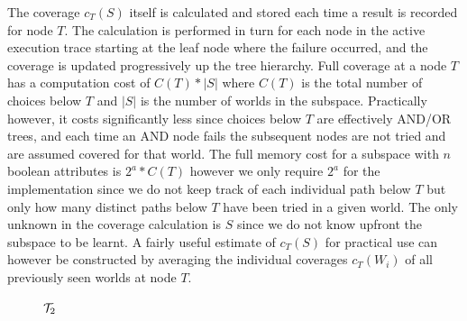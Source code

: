 The coverage $c_T(S)$ itself is calculated and stored each time a result is recorded for node $T$. The calculation is performed in turn for each node in the active execution trace starting at the leaf node where the failure occurred, and the coverage is updated progressively up the tree hierarchy. Full coverage at a node $T$ has a computation cost of $C(T)*|S|$ where $C(T)$ is the total number of choices below $T$ and $|S|$ is the number of worlds in the subspace. Practically however, it costs significantly less since choices below $T$ are effectively AND/OR trees, and each time an AND node fails the subsequent nodes are not tried and are assumed covered for that world. The full memory cost for a subspace with $n$ boolean attributes is $2^a*C(T)$ however we only require $2^a$ for the implementation since we do not keep track of each individual path below $T$ but only how many distinct paths below $T$ have been tried in a given world. The only unknown in the coverage calculation is $S$ since we do not know upfront the subspace to be learnt. A fairly useful estimate of $c_T(S)$ for practical use can however be constructed by averaging the individual coverages $c_T(W_i)$ of all previously seen worlds at node $T$. 


\begin{figure}[ht]
\centering
{}
\caption{${\mathcal{T}}_2$}
\end{figure}


